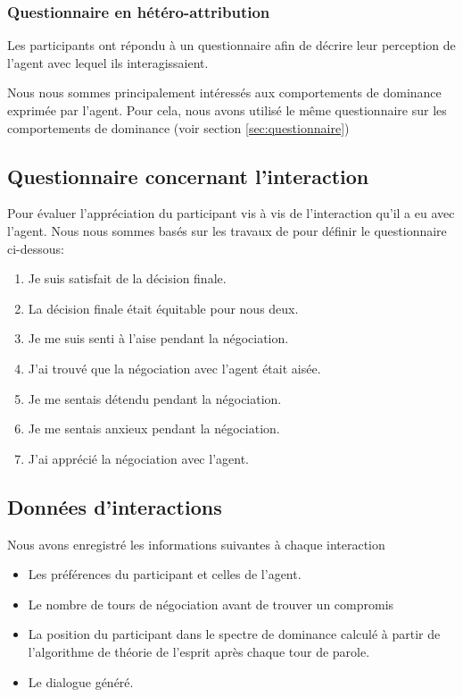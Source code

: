 \subsubsection{Questionnaire en hétéro-attribution}
Les participants ont répondu à un questionnaire afin de décrire leur perception de l’agent avec lequel ils interagissaient.

Nous nous sommes principalement intéressés aux comportements de dominance exprimée par l'agent. Pour cela, nous avons utilisé le même questionnaire sur les comportements de dominance (voir section \ref{sec:questionnaire})

\subsection{Questionnaire concernant l'interaction}
Pour évaluer l'appréciation du participant vis à vis de l'interaction qu'il a eu avec l'agent. Nous nous sommes basés sur les travaux de \cite{tiedens2003power,wiltermuth2009benefits,olekalns2013dyadic} pour définir le questionnaire ci-dessous:

\begin{enumerate}
	\item Je suis satisfait de la décision finale.
	\item La décision finale était équitable pour nous deux.
	\item Je me suis senti à l'aise pendant la négociation.
	\item J'ai trouvé que la négociation avec l'agent était aisée.
	\item Je me sentais détendu pendant la négociation.
	\item Je me sentais anxieux pendant la négociation.
	\item J'ai apprécié la négociation avec l'agent.
\end{enumerate}

\subsection{Données d'interactions}
Nous avons enregistré les informations suivantes à chaque interaction
\begin{itemize}
	\item Les préférences du participant et celles de l'agent.
	\item Le nombre de tours de négociation avant de trouver un compromis
	\item La position du participant dans le spectre de dominance calculé à partir de l'algorithme de théorie de l'esprit après chaque tour de parole.
	\item Le dialogue généré.
	
\end{itemize}


